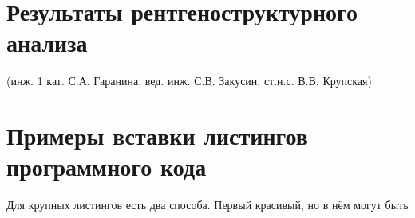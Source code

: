 



\chapter{Результаты рентгеноструктурного анализа}\label{app:difrac}
(инж. 1 кат. С.А. Гаранина, вед. инж. С.В. Закусин, ст.н.с. В.В. Крупская)









































\chapter{Примеры вставки листингов программного кода}\label{app:A}Для крупных листингов есть два способа. Первый красивый, но в нём могут быть

